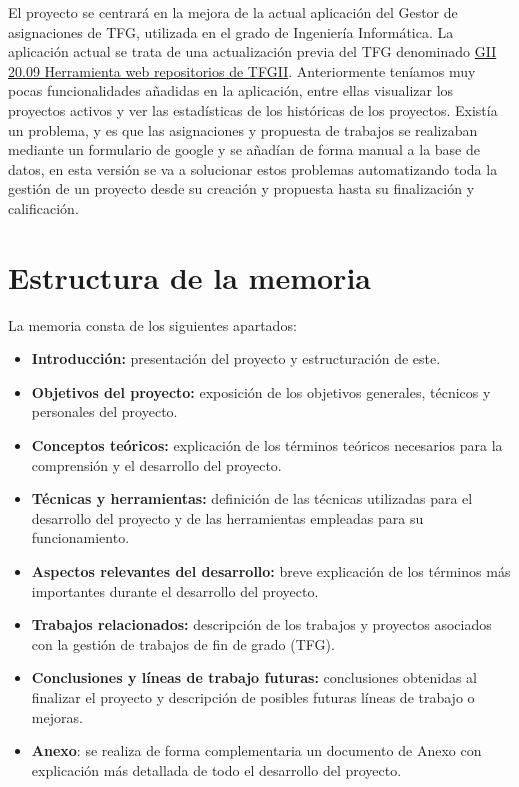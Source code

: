 
El proyecto se centrará en la mejora de la actual aplicación del Gestor de asignaciones de TFG, utilizada en el grado de Ingeniería Informática. La aplicación actual se trata de una actualización previa del TFG denominado \href{https://github.com/dbo1001/Gestor-TFG-2021}{GII 20.09 Herramienta web
repositorios de TFGII}. 
Anteriormente teníamos muy pocas funcionalidades añadidas en la aplicación, entre ellas visualizar los proyectos activos y ver las estadísticas de los históricas de los proyectos. Existía un problema, y es que las asignaciones y propuesta de trabajos se realizaban mediante un formulario de google y se añadían de forma manual a la base de datos, en esta versión se va a solucionar estos problemas automatizando toda la gestión de un proyecto desde su creación y propuesta hasta su finalización y calificación.


\section{Estructura de la memoria}
La memoria consta de los siguientes apartados:

\begin{itemize}
	\item \textbf{Introducción:} presentación del proyecto y estructuración de este.
	\item \textbf{Objetivos del proyecto:}  exposición de los  objetivos generales, técnicos y personales del proyecto.
	\item \textbf{Conceptos teóricos:} explicación de los términos teóricos necesarios para la comprensión y el desarrollo del proyecto.
	\item \textbf{Técnicas y herramientas:} definición de las técnicas utilizadas para el desarrollo del proyecto y de las herramientas empleadas para su funcionamiento.
	\item \textbf{Aspectos relevantes del desarrollo:} breve explicación de los términos más importantes durante el desarrollo del proyecto.
	\item \textbf{Trabajos relacionados:} descripción de los trabajos y proyectos asociados con la gestión de trabajos de fin de grado (TFG).
	\item \textbf{Conclusiones y líneas de trabajo futuras:} conclusiones obtenidas al finalizar el proyecto y descripción de posibles futuras líneas de trabajo o mejoras.
	\item \textbf{Anexo}: se realiza de forma complementaria un documento de Anexo con explicación más detallada de todo el desarrollo del proyecto.
\end{itemize}
